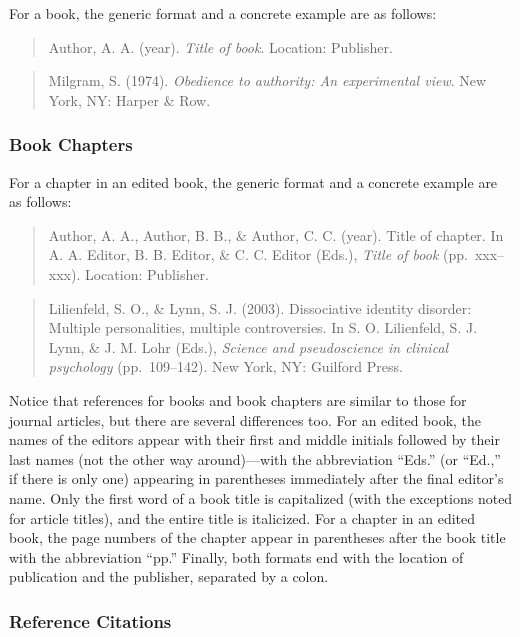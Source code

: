 \documentclass[
]{krantz}
\begin{document}
For a book, the generic format and a concrete example are as follows:

\begin{quote}
Author, A. A. (year). \emph{Title of book}. Location: Publisher.
\end{quote}

\begin{quote}
Milgram, S. (1974). \emph{Obedience to authority: An experimental view}. New York, NY: Harper \& Row.
\end{quote}

\hypertarget{book-chapters}{%
\subsubsection*{Book Chapters}\label{book-chapters}}


For a chapter in an edited book, the generic format and a concrete example are as follows:

\begin{quote}
Author, A. A., Author, B. B., \& Author, C. C. (year). Title of chapter. In A. A. Editor, B. B. Editor, \& C. C. Editor (Eds.), \emph{Title of book} (pp.~xxx--xxx). Location: Publisher.
\end{quote}

\begin{quote}
Lilienfeld, S. O., \& Lynn, S. J. (2003). Dissociative identity disorder: Multiple personalities, multiple controversies. In S. O. Lilienfeld, S. J. Lynn, \& J. M. Lohr (Eds.), \emph{Science and pseudoscience in clinical psychology} (pp.~109--142). New York, NY: Guilford Press.
\end{quote}

Notice that references for books and book chapters are similar to those for journal articles, but there are several differences too. For an edited book, the names of the editors appear with their first and middle initials followed by their last names (not the other way around)---with the abbreviation ``Eds.'' (or ``Ed.,'' if there is only one) appearing in parentheses immediately after the final editor's name. Only the first word of a book title is capitalized (with the exceptions noted for article titles), and the entire title is italicized. For a chapter in an edited book, the page numbers of the chapter appear in parentheses after the book title with the abbreviation ``pp.'' Finally, both formats end with the location of publication and the publisher, separated by a colon.

\hypertarget{reference-citations}{%
\subsubsection*{Reference Citations}\label{reference-citations}}
\end{document}
